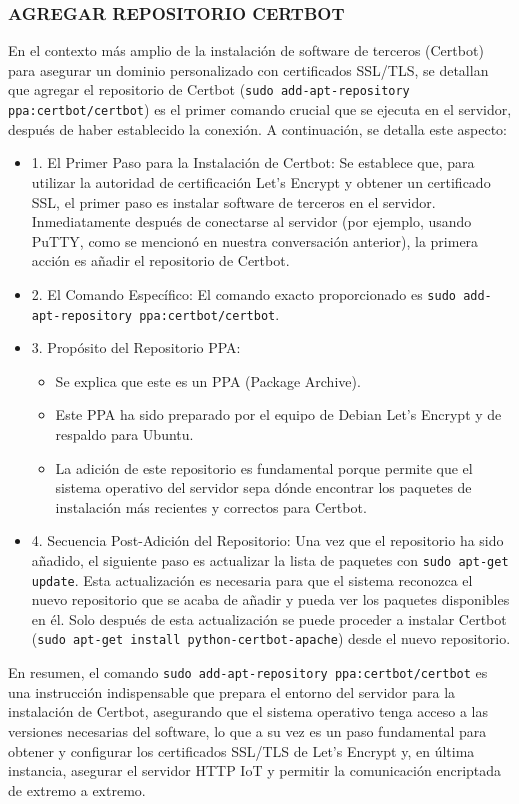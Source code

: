 \documentclass{report}
\begin{document}
\subsubsection{AGREGAR REPOSITORIO CERTBOT}
En el contexto más amplio de la instalación de software de terceros (Certbot) para asegurar un dominio personalizado con 
certificados SSL/TLS, se  detallan que agregar el repositorio de Certbot (\verb|sudo add-apt-repository ppa:certbot/certbot|)
es el primer comando crucial que se ejecuta en el servidor, después de haber establecido la conexión.
A continuación, se detalla este aspecto:
\begin{itemize}
    \item 1. El Primer Paso para la Instalación de Certbot: Se establece que, para utilizar la autoridad de certificación 
    Let's Encrypt y obtener un certificado SSL, el primer paso es instalar software de terceros en el servidor. Inmediatamente después 
    de conectarse al servidor (por ejemplo, usando PuTTY, como se mencionó en nuestra conversación anterior), la primera acción es añadir 
    el repositorio de Certbot.
    \item 2. El Comando Específico: El comando exacto proporcionado es \verb|sudo add-apt-repository ppa:certbot/certbot|.
    \item 3. Propósito del Repositorio PPA:
        \begin{itemize}
            \item Se explica que este es un PPA (Package Archive).
            \item Este PPA ha sido preparado por el equipo de Debian Let's Encrypt y de respaldo para Ubuntu.
            \item La adición de este repositorio es fundamental porque permite que el sistema operativo del servidor sepa dónde 
            encontrar los paquetes de instalación más recientes y correctos para Certbot.
        \end{itemize}
    \item 4. Secuencia Post-Adición del Repositorio: Una vez que el repositorio ha sido añadido, el siguiente paso es actualizar 
    la lista de paquetes con \verb|sudo apt-get update|. Esta actualización es necesaria para que el sistema reconozca el nuevo 
    repositorio que se acaba de añadir y pueda ver los paquetes disponibles en él. Solo después de esta actualización se puede 
    proceder a instalar Certbot (\verb|sudo apt-get install python-certbot-apache|) desde el nuevo repositorio.
\end{itemize}
En resumen, el comando \verb|sudo add-apt-repository ppa:certbot/certbot| es una instrucción indispensable que prepara el entorno 
del servidor para la instalación de Certbot, asegurando que el sistema operativo tenga acceso a las versiones necesarias del software, 
lo que a su vez es un paso fundamental para obtener y configurar los certificados SSL/TLS de Let's Encrypt y, en última instancia, 
asegurar el servidor HTTP IoT y permitir la comunicación encriptada de extremo a extremo.
\end{document}
